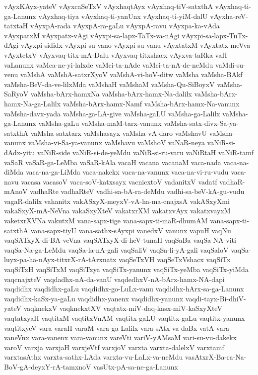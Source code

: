 {vAyxKAyx-yateV
vAyxcaSeTxV
vAyxhaqtAyx
vAyxhaq-tiV-satxthA
vAyxhaq-ti-ga-Lanunx
vAyxhaq-tiya
vAyxhaq-ti-yanUnx
vAyxhaq-ti-yiM-dalU
vAyxha-reV-tatxtaH
vAyxpA-rada
vAyxpA-ra-gaLu
vAyxpA-ravu
vAyxpa-ka-vAda
vAyxpatxM
vAyxpatx-vAgi
vAyxpi-sa-lapx-TaTx-va-nAgi
vAyxpi-sa-lapx-TuTx-dAgi
vAyxpi-sididx
vAyxpi-su-vano
vAyxpi-su-vanu
vAyxtatxM
vAyxtatx-meVva
vAyxtetxV
vAyxvaq-titx-mA-Dalu
vAyxvaq-titxshacx
vAyxva-taRka
vaH
vaLanunx
vaMca-ne-yi-lalxde
vaMci-ta-nAde
vaMci-ta-nA-de-neMdu
vaMdi-su-venu
vaMshA
vaMshA-satxrXyoV
vaMshA-vi-hoV-ditw
vaMsha
vaMsha-BAkf
vaMsha-BeV-da-ve-lilxMda
vaMshaH
vaMshaM
vaMsha-Qu-SiBoyxV
vaMsha-SaRyoV
vaMsha-bArx-hamxNa
vaMsha-bArx-hamx-Na-dalilx
vaMsha-bArx-hamx-Na-ga-Lalilx
vaMsha-bArx-hamx-Namf
vaMsha-bArx-hamx-Na-vanunx
vaMsha-davx-yada
vaMsha-ga-LA-give
vaMsha-gaLU
vaMsha-ga-Lalilx
vaMsha-ga-Lanunx
vaMsha-gaLu
vaMsha-maM-tarx-vanunx
vaMsha-satx-divx-Sa-ya-satxthA
vaMsha-satxtarx
vaMshasayx
vaMsha-vA-daro
vaMshavU
vaMsha-vanunx
vaMsha-vi-Sa-ya-vanunx
vaMshavu
vaMshoV
vaNaR-neya
vaNiR-si-dAdx-yitu
vaNiR-side
vaNiR-si-de-yeMdu
vaNiR-si-ru-varu
vaNiRtaH
vaNiR-tamf
vaSaR
vaSaR-ga-LeMba
vaSaR-kAla
vacaH
vacana
vacanaM
vaca-nada
vaca-na-diMda
vaca-na-ga-LiMda
vaca-nakekx
vaca-na-vanunx
vaca-na-vi-ru-vudu
vaca-navu
vacasa
vacasoV
vaca-soV-katxsayx
vacnicxtoV
vadanitxV
vadatf
vadhaR-mAnoV
vadhaRte
vadhaRteV
vadhi-sa-bA-ra-deMdu
vadhi-sa-beV-kA-gu-vudu
vagaR-dalilx
vahanitx
vakASxyX-meyxV-vA-ha-ma-cnajxsA
vakASxyXmi
vakaSxyX-mA-NeVna
vakaSxyXteV
vakatxrXM
vakatxvAyx
vakatxvayxM
vaketxrXVNa
vakutxM
vana-sapx-tige
vana-sapx-ti-maR-dhumAM
vana-sapx-ti-satxthA
vana-sapx-tiyU
vana-sathx-sAyxpi
vanedxV
vanunx
vapuH
vaqNu
vaqSATxyX-di-BA-veVna
vaqSATxyX-di-heV-tunaH
vaqSaBa
vaqSa-NA-viti
vaqSa-Na-ga-LeMdu
vaqSa-la-nA-gali
vaqSaliV
vaqSa-li-yA-gali
vaqSaloV
vaqSa-luyx-pa-ha-nAyx-titxrX-rA-tArxnatx
vaqSeTxVH
vaqSeTxVshacx
vaqSiTx
vaqSiTxH
vaqSiTxM
vaqSiTxya
vaqSiTx-yanunx
vaqSiTx-yeMba
vaqSiTx-yiMda
vaqcnajxteV
vaqdadhx-nA-da-vanU
vaqdedhxV-nA-bArx-hamx-NA-dapi
vaqdidhx
vaqdidhx-gaLu
vaqdidhx-go-LuLx-vanu
vaqdidhx-hArx-sa-ga-Lanunx
vaqdidhx-kaSx-ya-gaLu
vaqdidhx-yanenx
vaqdidhx-yanunx
vaqdi-tayx-Bi-dhiV-yateV
vaqknekxV
vaqknekxtXV
vaqtatx-miV-daq-kasx-miV-kaSxyXteV
vaqtatxyaH
vaqtitxM
vaqtitxVnAM
vaqtitx-gaLU
vaqtitx-gaLu
vaqtitx-yanunx
vaqtitxyeV
vara
varaH
varaM
vara-ga-Lalilx
vara-sAtx-va-daBx-vatA
vara-vaneVnx
vara-vanenx
vara-vanunx
vareVti
variV-yAMsaM
vari-su-vu-dakekx
varoV
varxja
varxjaH
varxjeVtf
varxjoV
varxta
varxta-dalelxV
varxtamf
varxtasAthx
varxta-sathx-LAda
varxta-vu-LaLx-va-neMdu
vasAtxrX-Ba-ra-Na-BoV-gA-deyxY-rA-tamxnoV
vasUtx-pA-sa-ne-ga-Lanunx
}
